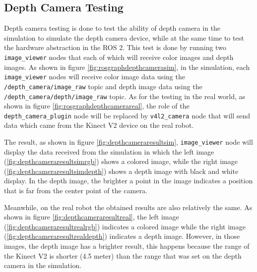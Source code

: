 \subsection{Depth Camera Testing}
\label{subsec:depthcameratesting}




Depth camera testing is done to test the ability of depth camera in the simulation to simulate the depth camera device,
  while at the same time to test the hardware abstraction in the ROS 2.
This test is done by running two \lstinline{image_viewer} nodes that each of which will receive color images and depth images.
As shown in figure \ref{fig:rosgraphdepthcamerasim},
  in the simulation,
  each \lstinline{image_viewer} nodes will receive color image data using the \lstinline{/depth_camera/image_raw} topic and depth image data using the \lstinline{/depth_camera/depth/image_raw} topic.
As for the testing in the real world,
  as shown in figure \ref{fig:rosgraphdepthcamerareal},
  the role of the \lstinline{depth_camera_plugin} node will be replaced by \lstinline{v4l2_camera} node that will send data which came from the Kinect V2 device on the real robot.



The result,
  as shown in figure \ref{fig:depthcameraresultsim},
  \lstinline{image_viewer} node will display the data received from the simulation in which the left image (\ref{fig:depthcameraresultsimrgb}) shows a colored image,
  while the right image (\ref{fig:depthcameraresultsimdepth}) shows a depth image with black and white display.
In the depth image,
  the brighter a point in the image indicates a position that is far from the center point of the camera.



Meanwhile,
  on the real robot the obtained results are also relatively the same.
As shown in figure \ref{fig:depthcameraresultreal},
  the left image (\ref{fig:depthcameraresultrealrgb}) indicates a colored image while the right image (\ref{fig:depthcameraresultrealdepth}) indicates a depth image.
However,
  in those images,
  the depth image has a brighter result,
  this happens because the range of the Kinect V2 is shorter (4.5 meter) than the range that was set on the depth camera in the simulation.
